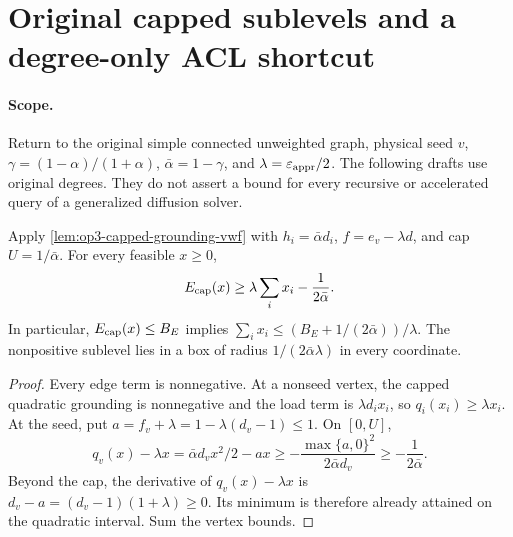 \section[Original capped sublevels]{Original capped sublevels and a degree-only ACL shortcut}
\label{sec:op3-capped-sublevels}

\paragraph{Scope.}
Return to the original simple connected unweighted graph, physical seed
$v$, $\gamma=(1-\alpha)/(1+\alpha)$, $\bar\alpha=1-\gamma$, and
$\lambda=\varepsilon_{\mathrm{appr}}/2$. The following \statusproved{} drafts use original
degrees. They do not assert a bound for every recursive or accelerated
query of a generalized diffusion solver.

\begin{lemma}
\label{lem:op3-original-capped-coercivity}
Apply \cref{lem:op3-capped-grounding-vwf} with
$h_i=\bar\alpha d_i$, $f=e_v-\lambda d$, and cap $U=1/\bar\alpha$.
For every feasible $x\geq0$,
\begin{equation}
 E_{\rm cap}(x)\geq\lambda\sum_i x_i-\frac1{2\bar\alpha}.
 \label{eq:op3-original-capped-coercivity}
\end{equation}
In particular, $E_{\rm cap}(x)\leq B_E$ implies
$\sum_i x_i\leq(B_E+1/(2\bar\alpha))/\lambda$.
The nonpositive sublevel lies in a box of radius
$1/(2\bar\alpha\lambda)$ in every coordinate.
\end{lemma}
\begin{proof}
Every edge term is nonnegative. At a nonseed vertex, the capped quadratic
grounding is nonnegative and the load term is $\lambda d_ix_i$,
so $q_i(x_i)\geq\lambda x_i$. At the seed, put
$a=f_v+\lambda=1-\lambda(d_v-1)\leq1$. On $[0,U]$,
\[
 q_v(x)-\lambda x=\bar\alpha d_vx^2/2-ax
 \geq-\frac{\max\{a,0\}^2}{2\bar\alpha d_v}
 \geq-\frac1{2\bar\alpha}.
\]
Beyond the cap, the derivative of $q_v(x)-\lambda x$ is
$d_v-a=(d_v-1)(1+\lambda)\geq0$. Its minimum is therefore already
attained on the quadratic interval. Sum the vertex bounds.
\end{proof}

